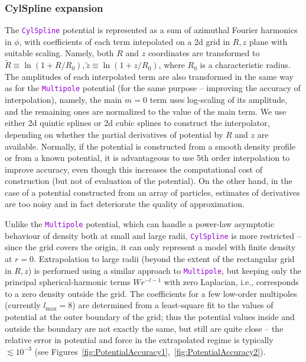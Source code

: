 \documentclass[12pt]{article}
\newcommand{\ttt}[1]{\textcolor{darkviolet}{\texttt{#1}}}
\begin{document}
\subsubsection{CylSpline expansion}  \label{sec:PotentialCylSplineDetails}

The \ttt{CylSpline} potential is represented as a sum of azimuthal Fourier harmonics in $\phi$, with coefficients of each term intepolated on a 2d grid in $R,z$ plane with suitable scaling.
Namely, both $R$ and $z$ coordinates are transformed to $\tilde R \equiv \ln(1+R/R_0), \tilde z \equiv \ln(1+z/R_0)$, where $R_0$ is a characteristic radius. The amplitudes of each interpolated term are also transformed in the same way as for the \ttt{Multipole} potential (for the same purpose -- improving the accuracy of interpolation), namely, the main $m=0$ term uses log-scaling of its amplitude, and the remaining ones are normalized to the value of the main term. We use either 2d quintic splines or 2d cubic splines to construct the interpolator, depending on whether the partial derivatives of potential by $R$ and $z$ are available. Normally, if the potential is constructed from a smooth density profile or from a known potential, it is advantageous to use 5th order interpolation to improve accuracy, even though this increases the computational cost of construction (but not of evaluation of the potential). On the other hand, in the case of a potential constructed from an array of particles, estimates of derivatives are too noisy and in fact deteriorate the quality of approximation.

Unlike the \ttt{Multipole} potential, which can handle a power-law asymptotic behaviour of density both at small and large radii, \ttt{CylSpline} is more restricted -- since the grid covers the origin, it can only represent a model with finite density at $r=0$. Extrapolation to large radii (beyond the extent of the rectangular grid in $R,z$) is performed using a similar approach to \ttt{Multipole}, but keeping only the principal spherical-harmonic terms $W r^{-l-1}$ with zero Laplacian, i.e., corresponds to a zero density outside the grid. The coefficients for a few low-order multipoles (currently $l_\mathrm{max}=8$) are determined from a least-square fit to the values of potential at the outer boundary of the grid; thus the potential values inside and outside the boundary are not exactly the same, but still are quite close -- the relative error in potential and force in the extrapolated regime is typically $\lesssim 10^{-3}$ (see Figures~\ref{fig:PotentialAccuracy1},~\ref{fig:PotentialAccuracy2}).
\end{document}
